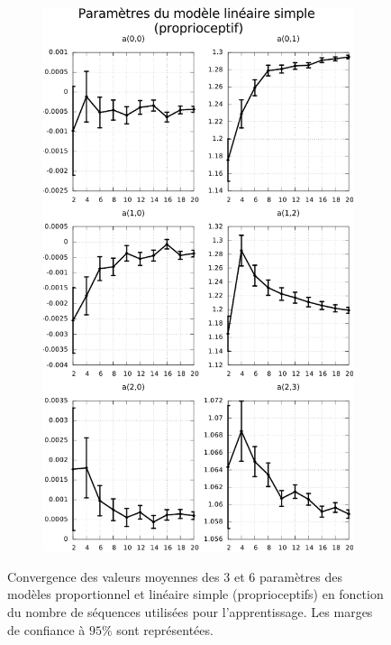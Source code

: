 \begin{figure}[h]
\begin{subfigure}{0.4\paperwidth}
        \includegraphics[type=pdf,ext=.pdf,read=.pdf,width=0.9\linewidth]{../plot/OdometryCMAES/parametersSimpleReads}
    \end{subfigure}
    \caption{\label{fig:odometry_cmaes_parameters_prop_simple_reads} 
        Convergence des valeurs moyennes des $3$ et $6$ paramètres des modèles proportionnel 
        et linéaire simple (proprioceptifs) en fonction du nombre de séquences utilisées pour l'apprentissage.
        Les marges de confiance à $95\%$ sont représentées.
    }
\end{figure}
